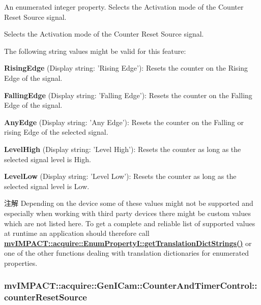 An enumerated integer property. Selects the Activation mode of the Counter Reset Source signal. 

Selects the Activation mode of the Counter Reset Source signal.

The following string values might be valid for this feature\+:
\begin{DoxyItemize}
\item {\bfseries Rising\+Edge} (Display string\+: 'Rising Edge')\+: Resets the counter on the Rising Edge of the signal.
\item {\bfseries Falling\+Edge} (Display string\+: 'Falling Edge')\+: Resets the counter on the Falling Edge of the signal.
\item {\bfseries Any\+Edge} (Display string\+: 'Any Edge')\+: Resets the counter on the Falling or rising Edge of the selected signal.
\item {\bfseries Level\+High} (Display string\+: 'Level High')\+: Resets the counter as long as the selected signal level is High.
\item {\bfseries Level\+Low} (Display string\+: 'Level Low')\+: Resets the counter as long as the selected signal level is Low.
\end{DoxyItemize}

\begin{DoxyNote}{注解}
Depending on the device some of these values might not be supported and especially when working with third party devices there might be custom values which are not listed here. To get a complete and reliable list of supported values at runtime an application should therefore call {\bfseries \hyperlink{classmv_i_m_p_a_c_t_1_1acquire_1_1_enum_property_i_a0ba6ccbf5ee69784d5d0b537924d26b6}{mv\+I\+M\+P\+A\+C\+T\+::acquire\+::\+Enum\+Property\+I\+::get\+Translation\+Dict\+Strings()}} or one of the other functions dealing with translation dictionaries for enumerated properties. 
\end{DoxyNote}
\hypertarget{classmv_i_m_p_a_c_t_1_1acquire_1_1_gen_i_cam_1_1_counter_and_timer_control_aec76b87580e5aef5ef034d11b44f1428}{
\subsubsection[{counter\+Reset\+Source}]{ mv\+I\+M\+P\+A\+C\+T\+::acquire\+::\+Gen\+I\+Cam\+::\+Counter\+And\+Timer\+Control\+::counter\+Reset\+Source}}\label{classmv_i_m_p_a_c_t_1_1acquire_1_1_gen_i_cam_1_1_counter_and_timer_control_aec76b87580e5aef5ef034d11b44f1428}


